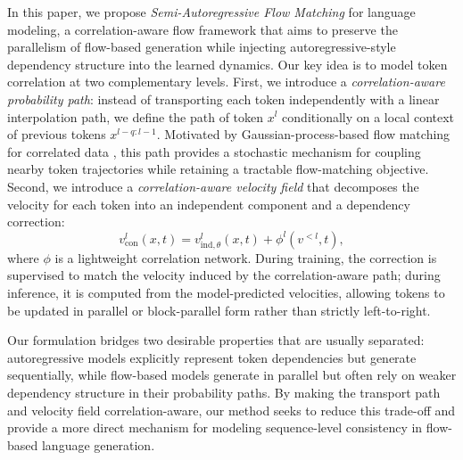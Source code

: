 \documentclass{article} %
\begin{document}
In this paper, we propose \emph{Semi-Autoregressive Flow Matching} for language modeling, a correlation-aware flow framework that aims to preserve the parallelism of flow-based generation while injecting autoregressive-style dependency structure into the learned dynamics. 
Our key idea is to model token correlation at two complementary levels. 
First, we introduce a \emph{correlation-aware probability path}: instead of transporting each token independently with a linear interpolation path, we define the path of token $x^l$ conditionally on a local context of previous tokens $x^{l-q:l-1}$. 
Motivated by Gaussian-process-based flow matching for correlated data \citep{wei2025streamlevel,kollovieh2025tsflow}, this path provides a stochastic mechanism for coupling nearby token trajectories while retaining a tractable flow-matching objective. 
Second, we introduce a \emph{correlation-aware velocity field} that decomposes the velocity for each token into an independent component and a dependency correction:
\begin{equation}
    v^l_{\mathrm{con}}(x,t)
    =
    v^l_{\mathrm{ind},\theta}(x,t)
    +
    \phi^l\!\left(v^{<l},t\right),
\end{equation}
where $\phi$ is a lightweight correlation network. 
During training, the correction is supervised to match the velocity induced by the correlation-aware path; during inference, it is computed from the model-predicted velocities, allowing tokens to be updated in parallel or block-parallel form rather than strictly left-to-right.

Our formulation bridges two desirable properties that are usually separated: autoregressive models explicitly represent token dependencies but generate sequentially, while flow-based models generate in parallel but often rely on weaker dependency structure in their probability paths. 
By making the transport path and velocity field correlation-aware, our method seeks to reduce this trade-off and provide a more direct mechanism for modeling sequence-level consistency in flow-based language generation.
\end{document}
